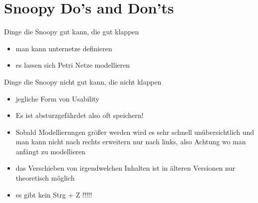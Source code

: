 \section{Snoopy Do's and Don'ts}
Dinge die Snoopy gut kann, die gut klappen

 \begin{itemize}
	\item man kann unternetze definieren
	\item es lassen sich Petri Netze modellieren
\end{itemize}


Dinge die Snoopy nicht gut kann, die nicht klappen
 \begin{itemize}
	\item jegliche Form von Usability
	\item Es ist absturzgefährdet also oft speichern!
	\item Sobald Modellierungen größer werden wird es sehr schnell unübersichtlich und man kann nicht nach rechts erweitern nur nach links, also Achtung wo man anfängt zu modellieren
	\item das Verschieben von irgendwelchen Inhalten ist in älteren Versionen nur theoretisch möglich
	\item es gibt kein Strg + Z !!!!!
\end{itemize}